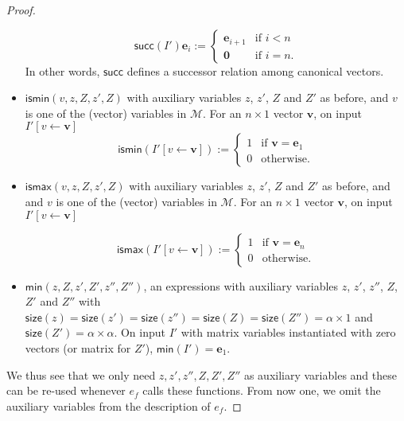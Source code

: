 \begin{proof}
\begin{itemize}
	 $$\mathsf{succ}(I')\mathbf{e}_i:=\begin{cases} 
	 \mathbf{e}_{i+1} & \text{if $i<n$}\\
	 \mathbf{0} & \text{if $i=n$}.
	\end{cases}
	$$
	In other words, $\mathsf{succ}$ defines a successor relation among canonical vectors.
	\item $\textsf{ismin}(v,z,Z,z',Z)$ with auxiliary variables $z$, $z'$, $Z$ and $Z'$ as before, and $v$ is one of the (vector) variables in $\mathcal{M}$. For an $n\times 1$ vector $\mathbf{v}$, on input $I'[v\gets \mathbf{v}]$	$$\mathsf{ismin}(I'[v\gets\mathbf{v}]):=\begin{cases} 1 & \text{if $\mathbf{v}=\mathbf{e}_1$}\\
		0 & \text{otherwise}.
		\end{cases}$$
	\item $\textsf{ismax}(v,z,Z,z',Z)$ with auxiliary variables $z$, $z'$, $Z$ and $Z'$ as before, and 
	and $v$ is one of the (vector) variables in $\mathcal{M}$. For an $n\times 1$ vector $\mathbf{v}$, on input $I'[v\gets \mathbf{v}]$
	
	$$\mathsf{ismax}(I'[v\gets\mathbf{v}]):=\begin{cases} 1 & \text{if $\mathbf{v}=\mathbf{e}_{n}$}\\
		0 & \text{otherwise}.
		\end{cases}$$
	\item $\mathsf{min}(z,Z,z',Z',z'',Z'')$, an expressions with
	auxiliary variables $z$, $z'$, $z''$, $Z$, $Z'$ and $Z''$ with $\mathsf{size}(z)=\mathsf{size}(z')=\mathsf{size}(z'')=\mathsf{size}(Z)=\mathsf{size}(Z'')=\alpha\times 1$ and $\mathsf{size}(Z')=\alpha\times\alpha$. On input $I'$ with 
	matrix variables instantiated with zero vectors (or matrix for $Z'$),
 	 $\mathsf{min}(I')=\mathbf{e}_1$. 
	 		
\end{itemize}
We thus see that we only need $z,z',z'',Z,Z',Z''$ as auxiliary variables and these can be re-used whenever $e_f$ calls these functions. From now one, we omit the auxiliary variables from the description of $e_f$.


\end{proof}
